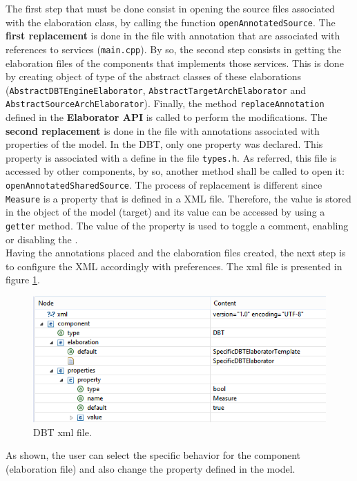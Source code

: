 \documentclass[12pt]{article}
\begin{document}
{The first step that must be done consist in opening the source files associated with the elaboration class, by calling the function \texttt{openAnnotatedSource}. The \textbf{first replacement} is done in the file with annotation that are associated with references to services (\texttt{main.cpp}). By so, the second step consists in getting the elaboration files of the components that implements those services. This is done by creating object of type of the abstract classes of these elaborations (\texttt{AbstractDBTEngineElaborator}, \texttt{AbstractTargetArchElaborator} and \texttt{AbstractSourceArchElaborator}). Finally, the method \texttt{replaceAnnotation} defined in the\textbf{ Elaborator API} is called to perform the modifications. The \textbf{second replacement} is done in the file with annotations associated with properties of the model. In the DBT, only one property was declared. This property is associated with a define in the file \texttt{types.h}. As referred, this file is accessed by other components, by so, another method shall be called to open it: \texttt{openAnnotatedSharedSource}. The process of replacement is different since \texttt{Measure} is a property that is defined in a XML file. Therefore, the value is stored in the object of the model (target) and its value can be accessed by using a \texttt{getter} method. The value of the property is used to toggle a comment, enabling or disabling the .  \\ 

Having the annotations placed and the elaboration files created, the next step is to configure the XML accordingly with preferences. The xml file is presented in figure \ref{fig:dbt_xml}.

\begin{figure}[H]
\centerline{
\includegraphics[scale=0.6]{images/mainxml}
}
\caption{DBT xml file.}
\label{fig:dbt_xml} 
\end{figure}

As shown, the user can select the specific behavior for the component (elaboration file) and also change the property defined in the model.





}
\end{document}
